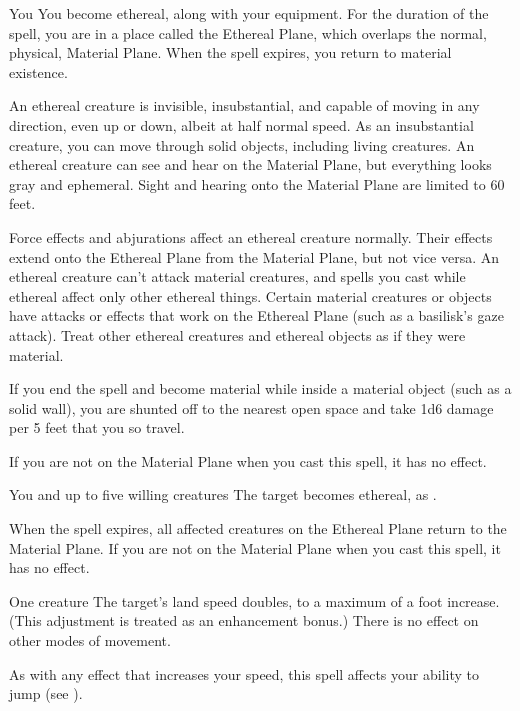 \spelldur{\durshort \dismissable}
\begin{spelltarget}{You}
    \spelleffect You become ethereal, along with your equipment. For the duration of the spell, you are in a place called the Ethereal Plane, which overlaps the normal, physical, Material Plane. When the spell expires, you return to material existence.
    \par An ethereal creature is invisible, insubstantial, and capable of moving in any direction, even up or down, albeit at half normal speed. As an insubstantial creature, you can move through solid objects, including living creatures. An ethereal creature can see and hear on the Material Plane, but everything looks gray and ephemeral. Sight and hearing onto the Material Plane are limited to 60 feet.
    \par Force effects and abjurations affect an ethereal creature normally. Their effects extend onto the Ethereal Plane from the Material Plane, but not vice versa. An ethereal creature can't attack material creatures, and spells you cast while ethereal affect only other ethereal things. Certain material creatures or objects have attacks or effects that work on the Ethereal Plane (such as a basilisk's gaze attack). Treat other ethereal creatures and ethereal objects as if they were material. 
    \par If you end the spell and become material while inside a material object (such as a solid wall), you are shunted off to the nearest open space and take 1d6 damage per 5 feet that you so travel.
\end{spelltarget}
\spellnotes If you are not on the Material Plane when you cast this spell, it has no effect.

\begin{spelltarget}{You and up to five willing creatures}
    \spelleffect The target becomes ethereal, as .
\end{spelltarget}
\spellnotes When the spell expires, all affected creatures on the Ethereal Plane return to the Material Plane. If you are not on the Material Plane when you cast this spell, it has no effect.

\spellrng{\rngclose}
\spelldur{\durshort \dismissable}
\begin{spelltarget}{One creature}
    \spelleffect The target's land speed doubles, to a maximum of a  foot increase. (This adjustment is treated as an enhancement bonus.) There is no effect on other modes of movement.
\end{spelltarget}
\spellnotes As with any effect that increases your speed, this spell affects your ability to jump (see ).

